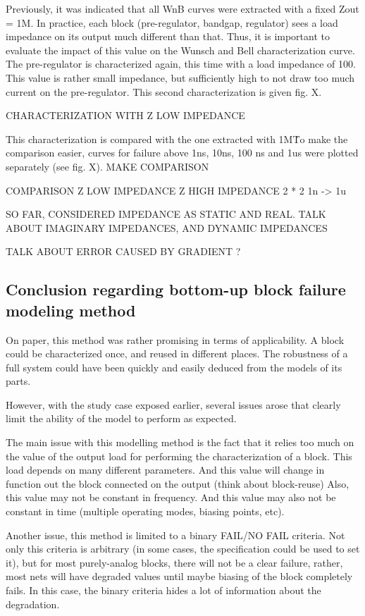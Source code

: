 Previously, it was indicated that all WnB curves were extracted with a fixed Zout = 1M\textOmega.
In practice, each block (pre-regulator, bandgap, regulator) sees a load impedance on its output much different than that.
Thus, it is important to evaluate the impact of this value on the Wunsch and Bell characterization curve.
The pre-regulator is characterized again, this time with a load impedance of 100\textOmega.
This value is rather small impedance, but sufficiently high to not draw too much current on the pre-regulator.
This second characterization is given fig. X.

CHARACTERIZATION WITH Z LOW IMPEDANCE

This characterization is compared with the one extracted with 1M\textOmega\.
To make the comparison easier, curves for failure above 1ns, 10ns, 100 ns and 1us were plotted separately (see fig. X).
MAKE COMPARISON

COMPARISON Z LOW IMPEDANCE Z HIGH IMPEDANCE 2 * 2 1n -> 1u

SO FAR, CONSIDERED IMPEDANCE AS STATIC AND REAL.
TALK ABOUT IMAGINARY IMPEDANCES, AND DYNAMIC IMPEDANCES

TALK ABOUT ERROR CAUSED BY GRADIENT ?


\subsection{Conclusion regarding bottom-up block failure modeling method}

On paper, this method was rather promising in terms of applicability.
A block could be characterized once, and reused in different places.
The robustness of a full system could have been quickly and easily deduced from the models of its parts.

However, with the study case exposed earlier, several issues arose that clearly limit the ability of the model to perform as expected.

The main issue with this modelling method is the fact that it relies too much
on the value of the output load for performing the characterization of a block.
This load depends on many different parameters.
And this value will change in function out the block connected on the output (think about block-reuse)
Also, this value may not be constant in frequency.
And this value may also not be constant in time (multiple operating modes, biasing points, etc).

Another issue, this method is limited to a binary FAIL/NO FAIL criteria.
Not only this criteria is arbitrary (in some cases, the specification could be used to set it), but
for most purely-analog blocks, there will not be a clear failure, rather, most
nets will have degraded values until maybe biasing of the block completely fails.
In this case, the binary criteria hides a lot of information about the degradation.

